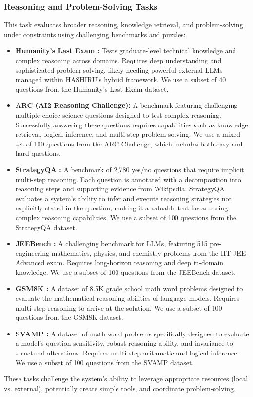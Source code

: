 \documentclass[conference]{IEEEtran}
\begin{document}
\subsubsection{Reasoning and Problem-Solving Tasks}
This task evaluates broader reasoning, knowledge retrieval, and problem-solving under constraints using challenging benchmarks and puzzles:
\begin{itemize}
    \item \textbf{Humanity's Last Exam \cite{phan2025humanitysexam}:} Tests graduate-level technical knowledge and complex reasoning across domains. Requires deep understanding and sophisticated problem-solving, likely needing powerful external LLMs managed within HASHIRU's hybrid framework.
    We use a subset of 40 questions from the Humanity's Last Exam dataset.
    \item \textbf{ARC (AI2 Reasoning Challenge)\cite{boratko2018systematic}:} A benchmark featuring challenging multiple-choice science questions designed to test complex reasoning. Successfully answering these questions requires capabilities such as knowledge retrieval, logical inference, and multi-step problem-solving.
    We use a mixed set of 100 questions from the ARC Challenge, which includes both easy and hard questions.
    \item \textbf{StrategyQA \cite{geva2021strategyqa}:} A benchmark of 2,780 yes/no questions that require implicit multi-step reasoning. Each question is annotated with a decomposition into reasoning steps and supporting evidence from Wikipedia. StrategyQA evaluates a system's ability to infer and execute reasoning strategies not explicitly stated in the question, making it a valuable test for assessing complex reasoning capabilities.
    We use a subset of 100 questions from the StrategyQA dataset.
    \item \textbf{JEEBench \cite{arora-etal-2023-llms}:} A challenging benchmark for LLMs, featuring 515 pre-engineering mathematics, physics, and chemistry problems from the IIT JEE-Advanced exam. Requires long-horizon reasoning and deep in-domain knowledge. 
    We use a subset of 100 questions from the JEEBench dataset.
    \item \textbf{GSM8K \cite{cobbe2021gsm8k}:} A dataset of 8.5K grade school math word problems designed to evaluate the mathematical reasoning abilities of language models. Requires multi-step reasoning to arrive at the solution.
    We use a subset of 100 questions from the GSM8K dataset.
    \item \textbf{SVAMP \cite{patel2021nlp}:} A dataset of math word problems specifically designed to evaluate a model's question sensitivity, robust reasoning ability, and invariance to structural alterations. Requires multi-step arithmetic and logical inference.
    We use a subset of 100 questions from the SVAMP dataset.
\end{itemize}
These tasks challenge the system's ability to leverage appropriate resources (local vs. external), potentially create simple tools, and coordinate problem-solving.
\end{document}
